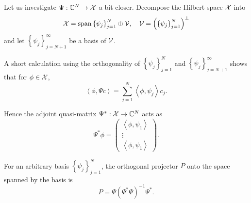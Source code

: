Let us investigate $\Psi : \mathbb{C}^N \to \mathcal{X}$ a bit closer. Decompose the Hilbert space 
$\mathcal{X}$ into 
\begin{equation}
    \mathcal{X} = \text{span} \left\{ \psi_j \right\}_{j=1}^N \oplus \mathcal{V}, \quad 
    \mathcal{V} = \left( \left\{ \psi_j \right\}_{j=1}^N \right)^\perp
\end{equation}
and let $\left\{ \psi_j \right\}_{j=N+1}^\infty$ be a basis of $\mathcal{V}$. 

A short calculation using the orthogonality of $\left\{ \psi_j \right\}_{j=1}^N$ and 
$\left\{ \psi_j \right\}_{j=N+1}^\infty$ shows that for $\phi \in \mathcal{X}$, 
\begin{equation}
    \left\langle \phi, \Psi c \right\rangle 
    = \sum_{j=1}^{N} \left\langle \phi, \psi_j \right\rangle c_j . 
\end{equation}
\iffalse
Let $\phi = \sum_{i=1}^{\infty} b_i \psi_i$ and observe
\begin{align}
    \left\langle \phi, \Psi c \right\rangle
    &= \sum_{i=1}^{\infty} \sum_{j=1}^{N} b_i c_j \left\langle \psi_i, \psi_j \right\rangle \\
    &= \sum_{i=1}^{N} \sum_{j=1}^{N} b_i c_j \left\langle \psi_i, \psi_j \right\rangle \\
    &= \sum_{j=1}^{N} \left\langle \sum_{i=1}^{N} b_i \psi_i, \psi_j \right\rangle c_j \\
    &= \sum_{j=1}^{N} \left\langle \sum_{i=1}^{\infty} b_i \psi_i, \psi_j \right\rangle c_j \\
    &= \sum_{j=1}^{N} \left\langle \phi, \psi_j \right\rangle c_j . 
\end{align}
\fi
Hence the adjoint quasi-matrix $\Psi^* : \mathcal{X} \to \mathbb{C}^N$ acts as 
\begin{equation}
    \Psi^* \phi = \begin{pmatrix}
        \left\langle \phi, \psi_1 \right\rangle \\
        \vdots \\
        \left\langle \phi, \psi_1 \right\rangle
    \end{pmatrix} . 
\end{equation}

\begin{lemma}
    For an arbitrary basis $\left\{ \psi_j \right\}_{j=1}^N$, the orthogonal projector $P$ 
    onto the space spanned by the basis is 
    \begin{equation}
        P = \Psi (\Psi^* \Psi)^{-1} \Psi^* . 
    \end{equation}
\end{lemma}

